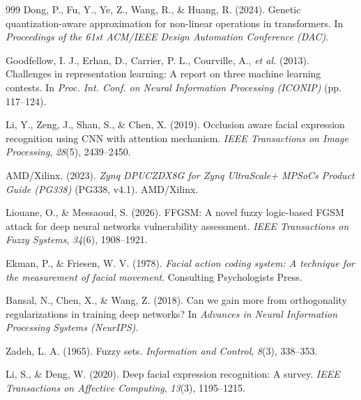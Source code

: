 \documentclass[algorithms,article,submit,moreauthors]{Definitions/mdpi}
\begin{document}
{\begin{thebibliography}{999}
Dong, P., Fu, Y., Ye, Z., Wang, R., \& Huang, R. (2024). Genetic quantization-aware approximation for non-linear operations in transformers. In \textit{Proceedings of the 61st ACM/IEEE Design Automation Conference (DAC)}.

Goodfellow, I. J., Erhan, D., Carrier, P. L., Courville, A., \textit{et al.} (2013). Challenges in representation learning: A report on three machine learning contests. In \textit{Proc. Int. Conf. on Neural Information Processing (ICONIP)} (pp. 117--124).

Li, Y., Zeng, J., Shan, S., \& Chen, X. (2019). Occlusion aware facial expression recognition using CNN with attention mechanism. \textit{IEEE Transactions on Image Processing}, \textit{28}(5), 2439--2450.

AMD/Xilinx. (2023). \textit{Zynq DPUCZDX8G for Zynq UltraScale+ MPSoCs Product Guide (PG338)} (PG338, v4.1). AMD/Xilinx.

Liouane, O., \& Messaoud, S. (2026). FFGSM: A novel fuzzy logic-based FGSM attack for deep neural networks vulnerability assessment. \textit{IEEE Transactions on Fuzzy Systems}, \textit{34}(6), 1908--1921.

Ekman, P., \& Friesen, W. V. (1978). \textit{Facial action coding system: A technique for the measurement of facial movement}. Consulting Psychologists Press.

Bansal, N., Chen, X., \& Wang, Z. (2018). Can we gain more from orthogonality regularizations in training deep networks? In \textit{Advances in Neural Information Processing Systems (NeurIPS)}.

Zadeh, L. A. (1965). Fuzzy sets. \textit{Information and Control}, \textit{8}(3), 338--353.

Li, S., \& Deng, W. (2020). Deep facial expression recognition: A survey. \textit{IEEE Transactions on Affective Computing}, \textit{13}(3), 1195--1215.


\end{thebibliography}}
\end{document}
